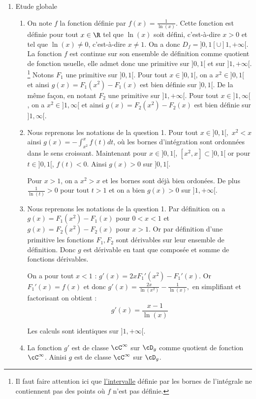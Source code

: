 \begin{correction}
\begin{enumerate}
\item Etude globale
\begin{enumerate}
\item On note $f$ la fonction définie par $f(x)=\frac{1}{\ln(x)}$.
Cette fonction est définie pour tout $x\in \R$ tel que $\ln(x)$ soit défini, c'est-à-dire $x>0$ et tel que $\ln(x)\neq0$, c'est-à-dire $x\neq 1$. On a donc $D_f =  ]0,1[\cup ]1,+\infty[$. 
La fonction $f$ est continue  sur son ensemble de définition comme quotient de fonction usuelle, elle admet donc une primitive sur $]0,1[$ et sur $]1,+\infty[$. \footnote{Il faut faire attention ici que \underline{l'intervalle} définie par les bornes de l'intégrale ne contiennent pas des points où $f$ n'est pas définie. } Notons $F_1$ une primitive sur $]0,1[$. Pour tout $x\in ]0,1[$, on a $x^2\in ]0,1[$ et ainsi $g(x)=F_1(x^2)-F_1(x)$ est bien définie sur $]0,1[$. 
De la même façon, en notant $F_2$ une primitive sur $]1,+\infty[$. Pour tout $x\in ]1,\infty[$, on a $x^2\in ]1,\infty[$ et ainsi $g(x)=F_2(x^2)-F_2(x)$ est bien définie sur $]1,\infty[$. 

\item 
Nous reprenons les notations de la question 1. Pour tout $x\in ]0,1[, $ $x^2<x$ ainsi $g(x) = -\int_{x^2}^x f(t)dt$, où les bornes d'intégration sont ordonnées dans le sens croissant. Maintenant pour $x\in ]0,1[$,  $[x^2,x] \subset ]0,1[$ or pour $t\in ]0,1[$, $f(t) < 0$. Ainsi $g(x)>0$ sur $]0,1[$. 

Pour $x>1$, on a $x^2>x$ et les bornes sont déjà bien ordonées. De plus $\frac{1}{\ln(t)}>0$ pour tout $t>1$ et on a bien $g(x)>0$ sur $]1,+\infty[$. 

\item Nous reprenons les notations de la question 1. Par définition on  a
$g(x) = F_1 (x^2) - F_1(x)$ pour $0<x<1$ et $g(x) = F_2 (x^2) - F_2(x)$ pour $x>1$. Or par définition d'une primitive les fonctions $F_1, F_2$ sont dérivables sur leur ensemble de définition. Donc $g$ est dérivable en tant que composée et somme de fonctions dérivables. 

On  a pour tout $x<1$ : $g'(x) = 2xF_1'(x^2) - F_1'(x)$. Or $F_1'(x) =f(x)$ et donc 
$g'(x) =\frac{2x}{\ln(x^2)}-\frac{1}{\ln(x)},  $ en simplifiant et factorisant on obtient : 
$$g'(x) = \frac{x-1}{\ln(x)}$$

Les calculs sont identiques sur $]1,+\infty[$. 

\item La fonction $g'$ est de classe $\cC^\infty$ sur $\cD_g$ comme quotient de fonction $\cC^\infty$. Ainisi $g$ est de classe $\cC^\infty$ sur $\cD_g$. 


\end{enumerate}
\end{enumerate}
\end{correction}
